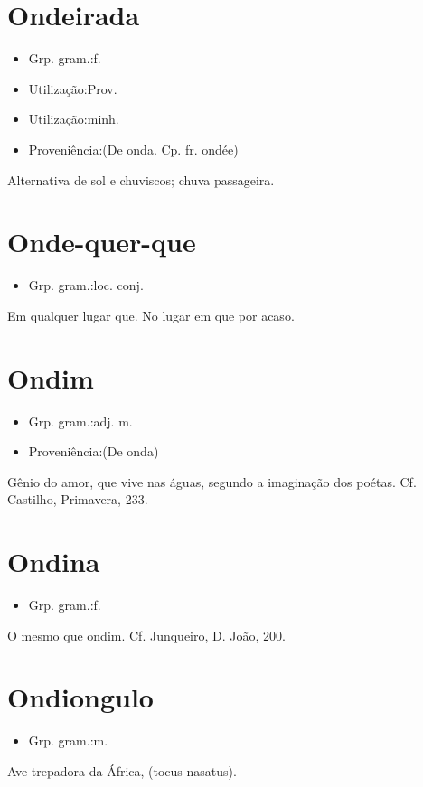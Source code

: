 \section{Ondeirada}
\begin{itemize}
\item {Grp. gram.:f.}
\end{itemize}
\begin{itemize}
\item {Utilização:Prov.}
\end{itemize}
\begin{itemize}
\item {Utilização:minh.}
\end{itemize}
\begin{itemize}
\item {Proveniência:(De \textunderscore onda\textunderscore . Cp. fr. \textunderscore ondée\textunderscore )}
\end{itemize}
Alternativa de sol e chuviscos; chuva passageira.
\section{Onde-quer-que}
\begin{itemize}
\item {Grp. gram.:loc. conj.}
\end{itemize}
Em qualquer lugar que.
No lugar em que por acaso.
\section{Ondim}
\begin{itemize}
\item {Grp. gram.:adj. m.}
\end{itemize}
\begin{itemize}
\item {Proveniência:(De \textunderscore onda\textunderscore )}
\end{itemize}
Gênio do amor, que vive nas águas, segundo a imaginação dos poétas. Cf. Castilho, \textunderscore Primavera\textunderscore , 233.
\section{Ondina}
\begin{itemize}
\item {Grp. gram.:f.}
\end{itemize}
O mesmo que \textunderscore ondim\textunderscore . Cf. Junqueiro, \textunderscore D. João\textunderscore , 200.
\section{Ondiongulo}
\begin{itemize}
\item {Grp. gram.:m.}
\end{itemize}
Ave trepadora da África, (\textunderscore tocus nasatus\textunderscore ).
